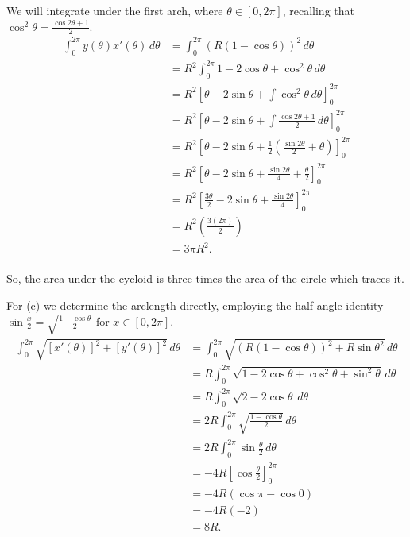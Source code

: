 \documentclass[../hw10]{subfiles}
\begin{document}
We will integrate under the first arch, where $\theta\in[0,2\pi]$, recalling that $\cos^2{\theta}=\frac{\cos{2\theta}+1}{2}$.
\begin{align*}
    \int_{0}^{2\pi} y(\theta)x'(\theta)\, d\theta &= \int_{0}^{2\pi} {(R(1-\cos{\theta}))}^2\, d\theta \\
    &= R^2 \int_{0}^{2\pi} 1-2\cos{\theta}+\cos^2{\theta} \, d\theta \\
    &= R^2{\left[ \theta-2\sin{\theta}+\int\cos^2{\theta}\, d\theta \right]}_{0}^{2\pi} \\
    &= R^2{\left[ \theta-2\sin{\theta}+\int\frac{\cos{2\theta}+1}{2}\, d\theta \right]}_{0}^{2\pi} \\
    &= R^2{\left[ \theta-2\sin{\theta}+\frac{1}{2}\left( \frac{\sin{2\theta}}{2} + \theta \right) \right]}_{0}^{2\pi} \\
    &= R^2{\left[ \theta-2\sin{\theta}+\frac{\sin{2\theta}}{4}+\frac{\theta}{2}\right]}_{0}^{2\pi} \\
    &= R^2{\left[ \frac{3\theta}{2}-2\sin{\theta}+\frac{\sin{2\theta}}{4}\right]}_{0}^{2\pi} \\
    &= R^2\left( \frac{3(2\pi)}{2} \right) \\
    &= 3\pi R^2. \\
\end{align*}

So, the area under the cycloid is three times the area of the circle which traces it.

For (c) we determine the arclength directly, employing the half angle identity $\sin{\frac{x}{2}}=\sqrt{\frac{1-\cos{\theta}}{2}}$ for $x\in[0,2\pi]$.
\begin{align*}
    \int_{0}^{2\pi} \sqrt{{[x'(\theta)]}^2+{[y'(\theta)]}^2} \, d\theta &= \int_{0}^{2\pi} \sqrt{{(R(1-\cos{\theta}))}^2+{R\sin{\theta}}^2} \, d\theta\\
    &= R \int_{0}^{2\pi} \sqrt{1-2\cos{\theta}+\cos^2{\theta}+\sin^2{\theta}} \, d\theta \\
    &= R \int_{0}^{2\pi} \sqrt{2-2\cos{\theta}} \, d\theta \\
    &= 2R \int_{0}^{2\pi} \sqrt{\frac{1-\cos{\theta}}{2}} \, d\theta \\
    &= 2R \int_{0}^{2\pi} \sin{\frac{\theta}{2}} \, d\theta \\
    &= -4R {[\cos{\frac{\theta}{2}}]}_{0}^{2\pi} \\
    &= -4R (\cos{\pi}-\cos{0}) \\
    &= -4R(-2) \\
    &= 8R. \\
\end{align*}
\end{document}
